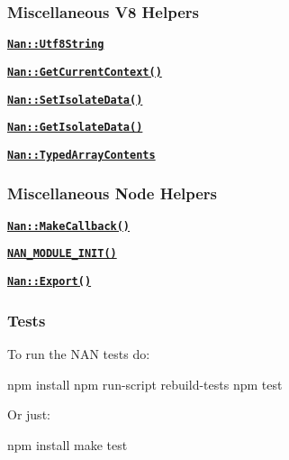 \subsubsection*{Miscellaneous V8 Helpers}


\begin{DoxyItemize}
\item \href{doc/v8_misc.md#api_nan_utf8_string}{\tt {\bfseries {\ttfamily Nan\+::\+Utf8\+String}}}
\item \href{doc/v8_misc.md#api_nan_get_current_context}{\tt {\bfseries {\ttfamily Nan\+::\+Get\+Current\+Context()}}}
\item \href{doc/v8_misc.md#api_nan_set_isolate_data}{\tt {\bfseries {\ttfamily Nan\+::\+Set\+Isolate\+Data()}}}
\item \href{doc/v8_misc.md#api_nan_get_isolate_data}{\tt {\bfseries {\ttfamily Nan\+::\+Get\+Isolate\+Data()}}}
\item \href{doc/v8_misc.md#api_nan_typedarray_contents}{\tt {\bfseries {\ttfamily Nan\+::\+Typed\+Array\+Contents}}}
\end{DoxyItemize}

\subsubsection*{Miscellaneous Node Helpers}


\begin{DoxyItemize}
\item \href{doc/node_misc.md#api_nan_make_callback}{\tt {\bfseries {\ttfamily Nan\+::\+Make\+Callback()}}}
\item \href{doc/node_misc.md#api_nan_module_init}{\tt {\bfseries {\ttfamily N\+A\+N\+\_\+\+M\+O\+D\+U\+L\+E\+\_\+\+I\+N\+I\+T()}}}
\item \href{doc/node_misc.md#api_nan_export}{\tt {\bfseries {\ttfamily Nan\+::\+Export()}}}
\end{DoxyItemize}

\label{_tests}%
 \subsubsection*{Tests}

To run the N\+AN tests do\+:


\begin{DoxyCode}
npm install
npm run-script rebuild-tests
npm test
\end{DoxyCode}


Or just\+:


\begin{DoxyCode}
npm install
make test
\end{DoxyCode}


